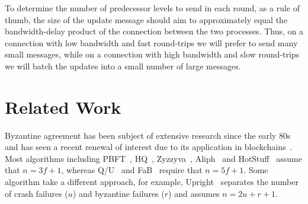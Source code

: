 \documentclass[manuscript]{acmart}
\begin{document}
To determine the number of predecessor levels to send in each round, as a rule of thumb, the size of the update message should aim to approximately equal the bandwidth-delay product of the connection between the two processes.
Thus, on a connection with low bandwidth and fast round-trips we will prefer to send many small messages, while on a connection with high bandwidth and slow round-trips we will batch the updates into a small number of large messages.


\section{Related Work}

Byzantine agreement has been subject of extensive research since the early 80s~\cite{Lamport:1982} and has seen a recent renewal of interest due to its application in blockchains~\cite{Bano:2019}.
Most algorithms including PBFT~\cite{Castro:1999}, HQ~\cite{Cowling:2006}, Zyzzyva~\cite{Kotla:2007}, Aliph~\cite{Aublin:2015} and HotStuff~\cite{Yin:2019} assume that $n=3f+1$, whereas Q/U~\cite{Abd:2005} and FaB~\cite{Martin:2006} require that $n=5f+1$.
Some algorithm take a different approach, for example, Upright~\cite{Clement:2009} separates the number of crash failures ($u$) and byzantine failures ($r$) and assumes $n=2u+r+1$.






\end{document}
